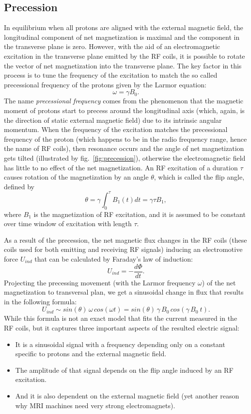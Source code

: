 \subsection{Precession}
In equilibrium when all protons are aligned with the external magnetic field, the longitudinal component of net magnetization is maximal and the component in the transverse plane is zero. However, with the aid of an electromagnetic excitation in the transverse plane emitted by the RF coils, it is possible to rotate the vector of net magnetization into the transverse plane. The key factor in this process is to tune the frequency of the excitation to match the so called precessional frequency of the protons given by the Larmor equation:
\[\omega = \gamma B_0.\]
The name \textit{precessional frequency} comes from the phenomenon that the magnetic moment of protons start to precess around the longitudinal axis (which, again, is the direction of static external magnetic field) due to its intrinsic angular momentum. When the frequency of the excitation matches the precessional frequency of the proton (which happens to be in the radio frequency range, hence the name of RF coils), then resonance occurs and the angle of net magnetization gets tilted (illustrated by fig.~\ref{fig:precession}), otherwise the electromagnetic field has little to no effect of the net magnetization. An RF excitation of a duration $\tau$ causes rotation of the magnetization by an angle $\theta$, which is called the flip angle, defined by
\[\theta = \gamma \int_0^\tau B_1(t) dt = \gamma \tau B_1,\]
where $B_1$ is the magnetization of RF excitation, and it is assumed to be constant over time window of excitation with length $\tau$.

As a result of the precession, the net magnetic flux changes in the RF coils (these coils used for both emitting and receiving RF signals) inducing an electromotive force $U_{ind}$ that can be calculated by Faraday's law of induction:
\[U_{ind} = -\frac{d\Phi}{dt}.\]
Projecting the precessing movement (with the Larmor frequency $\omega$) of the net magnetization to transversal plan, we get a sinusoidal change in flux that results in the following formula:
\[U_{ind} \sim sin(\theta)\, \omega\, cos(\omega t) = sin(\theta)\, \gamma\, B_0\, cos(\gamma\, B_0\ t).\]
While this formula is not an exact model that fits the current measured in the RF coils, but it captures three important aspects of the resulted electric signal:
\begin{itemize}
    \item It is a sinusoidal signal with a frequency depending only on a constant specific to protons and the external magnetic field.
    \item The amplitude of that signal depends on the flip angle induced by an RF excitation.
    \item And it is also dependent on the external magnetic field (yet another reason why MRI machines need very strong electromagnets).
\end{itemize}


